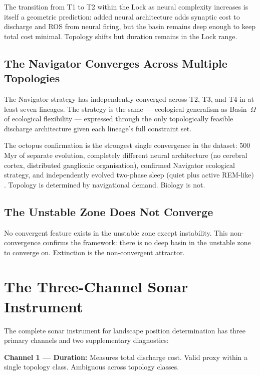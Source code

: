\documentclass[10pt, a4paper]{article}
\begin{document}
The transition from T1 to T2 within
the Lock as neural complexity increases
is itself a geometric prediction: added
neural architecture adds synaptic cost
to discharge and ROS from neural firing,
but the basin remains deep enough to
keep total cost minimal. Topology shifts
but duration remains in the Lock range.

\subsection{The Navigator Converges
Across Multiple Topologies}

The Navigator strategy has independently
converged across T2, T3, and T4 in at
least seven lineages. The strategy is
the same --- ecological generalism as
Basin~$\Omega$ of ecological flexibility
--- expressed through the only topologically
feasible discharge architecture given
each lineage's full constraint set.

The octopus confirmation is the
strongest single convergence in the
dataset: 500\,Myr of separate evolution,
completely different neural architecture
(no cerebral cortex, distributed
ganglionic organisation), confirmed
Navigator ecological strategy, and
independently evolved two-phase sleep
(quiet plus active REM-like)
\cite{medeiros2021sleeping}.
Topology is determined by navigational
demand. Biology is not.

\subsection{The Unstable Zone Does Not
Converge}

No convergent feature exists in the
unstable zone except instability.
This non-convergence confirms the
framework: there is no deep basin
in the unstable zone to converge on.
Extinction is the non-convergent
attractor.

\section{The Three-Channel Sonar
Instrument}
\label{sec:sonar}

The complete sonar instrument for
landscape position determination has
three primary channels and two
supplementary diagnostics:

\textbf{Channel 1 --- Duration:}
Measures total discharge cost. Valid
proxy within a single topology class.
Ambiguous across topology classes.
\end{document}
